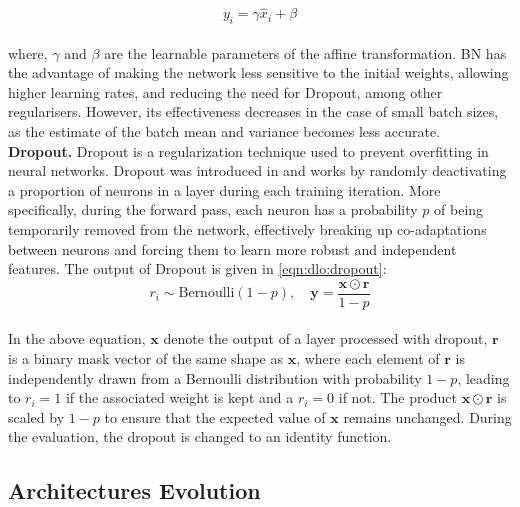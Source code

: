 \begin{equation}
  \label{eqn:dlo:batchnorm_affine}
  y_{i} = \gamma \hat{x}_{i} + \beta
\end{equation}\\

\noindent where, $\gamma$ and $\beta$ are the learnable parameters of the affine
transformation. \ac{BN} has the advantage of making the network less sensitive
to the initial weights, allowing higher learning rates, and reducing the need
for Dropout, among other regularisers. However, its effectiveness decreases in
the case of small batch sizes, as the estimate of the batch mean and variance
becomes less accurate.\\

\noindent \textbf{Dropout.} Dropout is a regularization technique used to
prevent overfitting in neural networks. Dropout was introduced in
\cite{DBLP:journals/jmlr/SrivastavaHKSS14} and works by randomly deactivating a
proportion of neurons in a layer during each training iteration. More
specifically, during the forward pass, each neuron has a probability $p$ of
being temporarily removed from the network, effectively breaking up
co-adaptations between neurons and forcing them to learn more robust and
independent features. The output of Dropout is given in \cref{eqn:dlo:dropout}:\\

\begin{equation}
  \label{eqn:dlo:dropout}
    r_i \sim \text{Bernoulli}(1 - p), \quad
    \mathbf{y} = \frac{\mathbf{x} \odot \mathbf{r}}{1 - p} 
\end{equation}\\

\noindent In the above equation, $\mathbf{x}$ denote the output of a layer
processed with dropout, $\mathbf{r}$ is a binary mask vector of the same shape
as $\mathbf{x}$, where each element of $\mathbf{r}$ is independently drawn from a
Bernoulli distribution with probability $1-p$, leading to $r_i=1$ if the
associated weight is kept and a $r_i=0$ if not. The product $\mathbf{x} \odot
\mathbf{r}$ is scaled by $1-p$ to ensure that the expected value of $\mathbf{x}$
remains unchanged. During the evaluation, the dropout is changed to an identity
function.

\subsection{Architectures Evolution}\label{sec:dlo:architectures}

